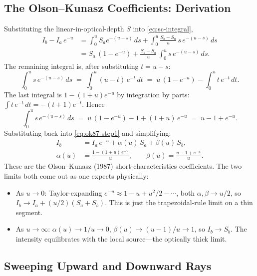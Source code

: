 \documentclass[11pt]{article}
\begin{document}
\subsection{The Olson--Kunasz Coefficients: Derivation}
\label{sec:ok87}

Substituting the linear-in-optical-depth $S$ into \eqref{eq:sc-integral},
\begin{align}
I_b - I_a\, e^{-u}
&= \int_0^u \!S_a e^{-(u-s)}\, ds + \int_0^u\! \frac{S_b - S_a}{u}\, s\, e^{-(u-s)}\, ds\\
&= S_a\,(1 - e^{-u}) + \frac{S_b - S_a}{u}\,\!\!\int_0^u\! s\, e^{-(u-s)}\, ds.
\label{eq:ok87-step1}
\end{align}
The remaining integral is, after substituting $t = u - s$:
\begin{equation}
\int_0^u\! s\, e^{-(u-s)}\, ds \;=\; \int_0^u (u - t)\, e^{-t}\, dt
\;=\; u\,(1 - e^{-u}) - \!\int_0^u\! t\, e^{-t}\, dt.
\end{equation}
The last integral is $1 - (1 + u) e^{-u}$ by integration by parts:
$\int t\, e^{-t}\, dt = -(t+1)e^{-t}$. Hence
\begin{equation}
\int_0^u\! s\, e^{-(u-s)}\, ds \;=\; u\,(1 - e^{-u}) - 1 + (1+u)\, e^{-u}
\;=\; u - 1 + e^{-u} .
\end{equation}
Substituting back into \eqref{eq:ok87-step1} and simplifying:
\begin{align}
I_b &= I_a\, e^{-u} + \alpha(u)\, S_a + \beta(u)\, S_b,
\label{eq:ok87}
\\
\alpha(u) &= \frac{1 - (1+u)\, e^{-u}}{u},\qquad
\beta(u) = \frac{u - 1 + e^{-u}}{u}.
\nonumber
\end{align}
These are the Olson--Kunasz (1987) short-characteristics coefficients.
The two limits both come out as one expects physically:
\begin{itemize}
\item As $u \to 0$: Taylor-expanding $e^{-u} \approx 1 - u + u^2/2 - \cdots$,
both $\alpha, \beta \to u/2$, so $I_b \to I_a + (u/2)(S_a + S_b)$.  This
is just the trapezoidal-rule limit on a thin segment.
\item As $u \to \infty$: $\alpha(u) \to 1/u \to 0$, $\beta(u) \to (u-1)/u \to 1$,
so $I_b \to S_b$.  The intensity equilibrates with the local source---the
optically thick limit.
\end{itemize}

\subsection{Sweeping Upward and Downward Rays}
\end{document}
